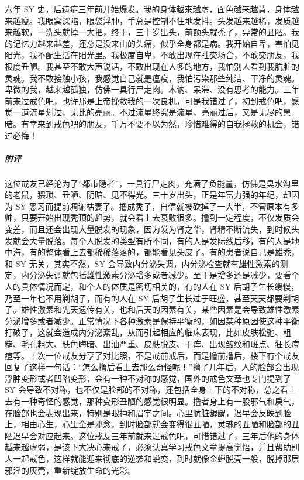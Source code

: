 \begin{case}
    六年 SY 史，后遗症三年前开始爆发。我的身体越来越虚，面色越来越黄，身体越来越瘦。我眼窝深陷，眼袋浮肿，手总是控制不住地发抖。头发越来越稀，发质越来越软，一洗头就掉一大把，终于，三十岁出头，前额头就秃了，异常的丑陋。我的记忆力越来越差，还总是没来由的头痛，似乎全身都是病。我开始自卑，害怕见阳光，我不配生活在阳光里。我极度自卑，不敢出现在社交场合，不敢交朋友，我极度丑陋。我甚至不敢大声说话，不敢出现在人多的地方，我怕别人看到我肮脏的灵魂。我不敢接触小孩，我感觉自己就是瘟疫，我怕污染那些纯洁、干净的灵魂。卑微的我，越来越孤独，仿佛一具行尸走肉。木讷、呆滞、没有思考的能力。三年前来过戒色吧，也许那是上帝挽救我的一次良机，可是我错过了，初到戒色吧，感觉一道流星划过，无比的亮丽。不过流星终究是流星，亮丽过后，又是无尽的黑暗。有幸来到戒色吧的朋友，千万不要不以为然，珍惜难得的自我拯救的机会，错过必悔！
    \subparagraph{附评} 这位戒友已经沦为了“都市隐者”，一具行尸走肉，充满了负能量，仿佛是臭水沟里的老鼠，猥琐、丑陋、阴暗、见不得光。三十岁出头，正是年富力强的年纪，却因为 SY 恶习而提前凋谢枯萎了。撸成秃子，自信就被砍掉了一大半，不管原本有多帅，只要开始出现秃顶的趋势，就会看上去衰败很多。撸到一定程度，不仅发质会变差，而且还会出现大量脱发的现象，因为发为肾之华，肾精不断流失，到时候头发就会大量脱落。每个人脱发的类型有所不同，有的人是发际线后移，有的人是地中海，有的整体看上去都稀稀落落的，都能看见头皮了。有的患者说自己是雄秃，和 SY 无关，其实不然，SY 会导致内分泌失调，内分泌检查就有雄性激素的测定，内分泌失调就包括雄性激素分泌增多或者减少。至于是增多还是减少，要看个人的具体情况而定，和个人的体质是密切相关的，有的人在 SY 后胡子生长缓慢，乃至一年也不用剃胡子，而有的人在 SY 后胡子生长过于旺盛，甚至天天都要剃胡子。雄性激素和先天遗传有关，也和后天的因素有关，某些因素是会导致雄性激素分泌增多或者减少。正常情况下各种激素是保持平衡的，如因某种原因使这种平衡打破了，这就会造成内分泌紊乱，从而引起相应的临床表现，比如皮肤松弛、粗糙、毛孔粗大、肤色晦暗、出油严重、皮肤脱皮、干痒、出现皱纹和斑点、狂长痘痘等。上次一位戒友分享了对比照，不是戒前戒后，而是撸前撸后，楼下有个戒友回复了这样一句话：“怎么撸后看上去那么奇怪呢！”撸了几年后，人的脸部会出现浮肿变形或者凹陷变形，会有一种不对称的感觉，国外的戒色文章也专门提到了 SY 会导致不对称，也不仅是脸部的不对称，还包括全身上下的不对称，总之看上去有一种奇怪的感觉，那种变形丑陋的感觉很明显。撸者身上有一股邪气和戾气，在脸部也会表现出来，特别是眼神和眉宇之间。心里肮脏龌龊，迟早会反映到脸上，相由心生，心里全是邪念，到时脸部就会变得很丑陋，灵魂的丑陋和脸部的丑陋迟早会对应起来。这位戒友三年前就来过戒色吧，可惜错过了，三年后他的身体越来越虚弱，是该下大决心来戒了，必须认真学习戒色文章提高觉悟，并且帮助别人一起戒色，这样就能迎来彻底的逆袭和蜕变，到时就像金蝉脱壳一般，脱掉那层邪淫的灰壳，重新绽放生命的光彩。
\end{case}


